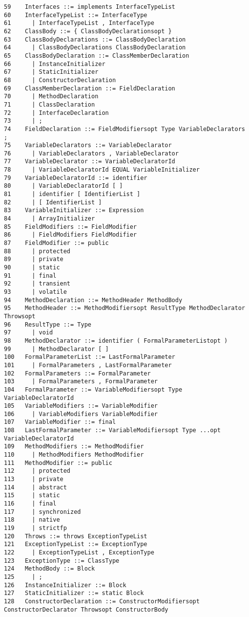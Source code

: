 {\begin{verbatim}
59    Interfaces ::= implements InterfaceTypeList
60    InterfaceTypeList ::= InterfaceType
61      | InterfaceTypeList , InterfaceType
62    ClassBody ::= { ClassBodyDeclarationsopt }
63    ClassBodyDeclarations ::= ClassBodyDeclaration
64      | ClassBodyDeclarations ClassBodyDeclaration
65    ClassBodyDeclaration ::= ClassMemberDeclaration
66      | InstanceInitializer
67      | StaticInitializer
68      | ConstructorDeclaration
69    ClassMemberDeclaration ::= FieldDeclaration
70      | MethodDeclaration
71      | ClassDeclaration
72      | InterfaceDeclaration
73      | ;
74    FieldDeclaration ::= FieldModifiersopt Type VariableDeclarators ;
75    VariableDeclarators ::= VariableDeclarator
76      | VariableDeclarators , VariableDeclarator
77    VariableDeclarator ::= VariableDeclaratorId
78      | VariableDeclaratorId EQUAL VariableInitializer
79    VariableDeclaratorId ::= identifier
80      | VariableDeclaratorId [ ]
81      | identifier [ IdentifierList ]
82      | [ IdentifierList ]
83    VariableInitializer ::= Expression
84      | ArrayInitializer
85    FieldModifiers ::= FieldModifier
86      | FieldModifiers FieldModifier
87    FieldModifier ::= public
88      | protected
89      | private
90      | static
91      | final
92      | transient
93      | volatile
94    MethodDeclaration ::= MethodHeader MethodBody
95    MethodHeader ::= MethodModifiersopt ResultType MethodDeclarator Throwsopt
96    ResultType ::= Type
97      | void
98    MethodDeclarator ::= identifier ( FormalParameterListopt )
99      | MethodDeclarator [ ]
100   FormalParameterList ::= LastFormalParameter
101     | FormalParameters , LastFormalParameter
102   FormalParameters ::= FormalParameter
103     | FormalParameters , FormalParameter
104   FormalParameter ::= VariableModifiersopt Type VariableDeclaratorId
105   VariableModifiers ::= VariableModifier
106     | VariableModifiers VariableModifier
107   VariableModifier ::= final
108   LastFormalParameter ::= VariableModifiersopt Type ...opt VariableDeclaratorId
109   MethodModifiers ::= MethodModifier
110     | MethodModifiers MethodModifier
111   MethodModifier ::= public
112     | protected
113     | private
114     | abstract
115     | static
116     | final
117     | synchronized
118     | native
119     | strictfp
120   Throws ::= throws ExceptionTypeList
121   ExceptionTypeList ::= ExceptionType
122     | ExceptionTypeList , ExceptionType
123   ExceptionType ::= ClassType
124   MethodBody ::= Block
125     | ;
126   InstanceInitializer ::= Block
127   StaticInitializer ::= static Block
128   ConstructorDeclaration ::= ConstructorModifiersopt ConstructorDeclarator Throwsopt ConstructorBody

\end{verbatim}}
